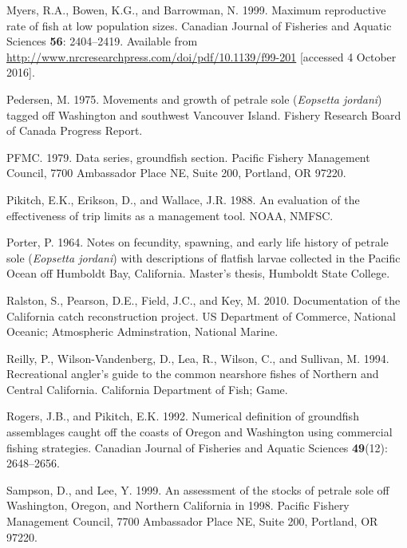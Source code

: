 \documentclass[12pt,]{article}
\begin{document}
\hypertarget{ref-myers_maximum_1999}{}
Myers, R.A., Bowen, K.G., and Barrowman, N. 1999. Maximum reproductive
rate of fish at low population sizes. Canadian Journal of Fisheries and
Aquatic Sciences \textbf{56}: 2404--2419. Available from
\url{http://www.nrcresearchpress.com/doi/pdf/10.1139/f99-201}
{[}accessed 4 October 2016{]}.

\hypertarget{ref-pedersen_movements_1975}{}
Pedersen, M. 1975. Movements and growth of petrale sole (\emph{Eopsetta
jordani}) tagged off Washington and southwest Vancouver Island. Fishery
Research Board of Canada Progress Report.

\hypertarget{ref-pfmc_data_1979}{}
PFMC. 1979. Data series, groundfish section. Pacific Fishery Management
Council, 7700 Ambassador Place NE, Suite 200, Portland, OR 97220.

\hypertarget{ref-pikitch_evaluation_1988}{}
Pikitch, E.K., Erikson, D., and Wallace, J.R. 1988. An evaluation of the
effectiveness of trip limits as a management tool. NOAA, NMFSC.

\hypertarget{ref-porter_notes_1964}{}
Porter, P. 1964. Notes on fecundity, spawning, and early life history of
petrale sole (\emph{Eopsetta jordani}) with descriptions of flatfish
larvae collected in the Pacific Ocean off Humboldt Bay, California.
Master's thesis, Humboldt State College.

\hypertarget{ref-ralston_documentation_2010}{}
Ralston, S., Pearson, D.E., Field, J.C., and Key, M. 2010. Documentation
of the California catch reconstruction project. US Department of
Commerce, National Oceanic; Atmospheric Adminstration, National Marine.

\hypertarget{ref-reilly_recreational_1994}{}
Reilly, P., Wilson-Vandenberg, D., Lea, R., Wilson, C., and Sullivan, M.
1994. Recreational angler's guide to the common nearshore fishes of
Northern and Central California. California Department of Fish; Game.

\hypertarget{ref-rogers_numerical_1992}{}
Rogers, J.B., and Pikitch, E.K. 1992. Numerical definition of groundfish
assemblages caught off the coasts of Oregon and Washington using
commercial fishing strategies. Canadian Journal of Fisheries and Aquatic
Sciences \textbf{49}(12): 2648--2656.

\hypertarget{ref-sampson_assessment_1999}{}
Sampson, D., and Lee, Y. 1999. An assessment of the stocks of petrale
sole off Washington, Oregon, and Northern California in 1998. Pacific
Fishery Management Council, 7700 Ambassador Place NE, Suite 200,
Portland, OR 97220.
\end{document}
